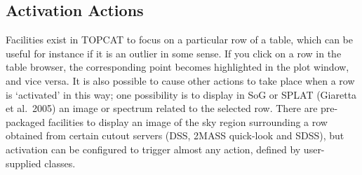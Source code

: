 \documentclass[11pt,twoside]{article}  %
\begin{document}
\subsection{Activation Actions}

Facilities exist in TOPCAT to focus on a particular row of a table,
which can be useful for instance if it is an outlier in some sense.
If you click on a row in the table browser, the corresponding point
becomes highlighted in the plot window, and vice versa.
It is also possible to cause other actions to take place when a row
is `activated' in this way; one possibility is to display
in SoG or SPLAT (Giaretta et al.\ 2005) 
an image or spectrum related to the selected row.
There are pre-packaged facilities to display an image of the sky region 
surrounding a row obtained from certain cutout servers
(DSS, 2MASS quick-look and SDSS), but activation can be configured to
trigger almost any action, defined by user-supplied classes.
\end{document}
